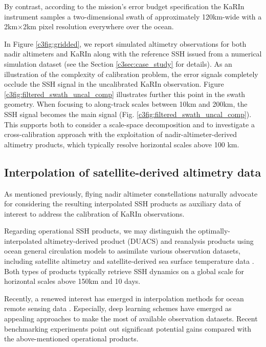 \begin{bibunit}
By contrast, according to the mission's error budget specification \cite{Peral_Esteban-Fernandez_2018} the KaRIn instrument samples a two-dimensional swath of approximately 120km-wide with a 2km$\times$2km pixel resolution everywhere over the ocean.


In Figure \ref{c3fig:gridded}, we report simulated altimetry observations for both nadir altimeters and KaRIn along with the reference SSH issued from a numerical simulation dataset (see  the Section \ref{c3sec:case_study} for details). As an illustration of the complexity of calibration problem, the error signals completely occlude the SSH signal in the uncalibrated KaRIn observation.
Figure \ref{c3fig:filtered_swath_uncal_comp} illustrates further this point in the swath geometry. When focusing to along-track scales between 10km and 200km, the SSH signal becomes the main signal (Fig. \ref{c3fig:filtered_swath_uncal_comp}). This supports
both to consider a scale-space decomposition and to 
investigate a cross-calibration approach with
the exploitation of nadir-altimeter-derived altimetry products, which typically resolve horizontal scales above 100 km.


\subsection*{Interpolation of satellite-derived altimetry data}
\label{c3subsec:interpolation}

As mentioned previously, flying nadir altimeter constellations naturally advocate for considering the resulting interpolated SSH products as auxiliary data of interest to address the calibration of KaRIn observations. 

Regarding operational SSH products, we may distinguish the optimally-interpolated altimetry-derived product (DUACS) \cite{taburet_duacs_2019} and reanalysis products using ocean general circulation models to assimilate various observation datasets, including satellite altimetry and satellite-derived sea surface temperature data \cite{glorys_rea_2021}. Both types of products typically retrieve SSH dynamics on a global scale for horizontal scales above 150km and 10 days. 

Recently, a renewed interest has emerged in interpolation methods for ocean remote sensing data \cite{beauchamp_intercomparison_2020}\cite{fablet_end2end_2021}. Especially, deep learning schemes have emerged as appealing approaches to make the most of available observation datasets. Recent benchmarking experiments \cite{osse_data_challenge} point out significant potential gains compared with the above-mentioned operational products.


\end{bibunit}
